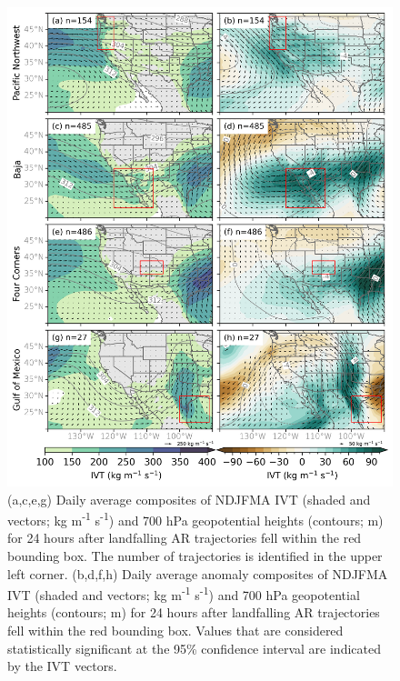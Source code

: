 \documentclass[jgrga]{agutexSI2019}
\begin{document}
\begin{article}
\begin{figure}
\noindent\includegraphics[scale=0.8]{figS5.png}
\caption{(a,c,e,g) Daily average composites of NDJFMA IVT (shaded and vectors; kg m\textsuperscript{-1} s\textsuperscript{-1}) and 700 hPa geopotential heights (contours; m) for 24 hours after landfalling AR trajectories fell within the red bounding box. The number of trajectories is identified in the upper left corner. (b,d,f,h) Daily average anomaly composites of NDJFMA IVT (shaded and vectors; kg m\textsuperscript{-1} s\textsuperscript{-1}) and 700 hPa geopotential heights (contours; m) for 24 hours after landfalling AR trajectories fell within the red bounding box. Values that are considered statistically significant at the 95\% confidence interval are indicated by the IVT vectors.}
\label{fig:supp:composites_NDJFMA_lag1}
\end{figure}
\clearpage


\end{article}
\end{document}
